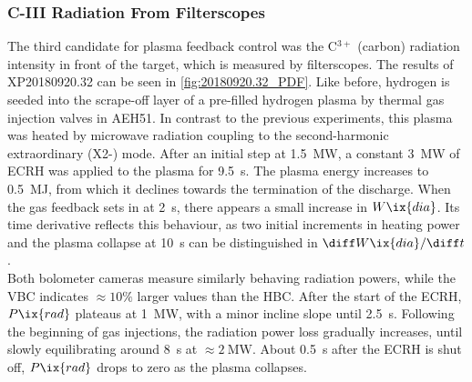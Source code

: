             \subsubsection*{C-III Radiation From Filterscopes}
%
                The third candidate for plasma feedback control was the C$^{3+}$ (carbon) radiation intensity in front of the target, which is measured by filterscopes. The results of XP20180920.32 can be seen in \cref{fig:20180920.32_PDF}. Like before, hydrogen is seeded into the scrape-off layer of a pre-filled hydrogen plasma by thermal gas injection valves in AEH51. In contrast to the previous experiments, this plasma was heated by microwave radiation coupling to the second-harmonic extraordinary (X2-) mode. After an initial step at \SI{1.5}{\mega\watt}, a constant \SI{3}{\mega\watt} of ECRH was applied to the plasma for \SI{9.5}{\second}. The plasma energy increases to \SI{0.5}{\mega\joule}, from which it declines towards the termination of the discharge. When the gas feedback sets in at \SI{2}{\second}, there appears a small increase in $W\ix{dia}$. Its time derivative reflects this behaviour, as two initial increments in heating power and the plasma collapse at \SI{10}{\second} can be distinguished in $\diff W\ix{dia}/\diff t$.\\%
                Both bolometer cameras measure similarly behaving radiation powers, while the VBC indicates $\approx10\%$ larger values than the HBC. After the start of the ECRH, $P\ix{rad}$ plateaus at \SI{1}{\mega\watt}, with a minor incline slope until \SI{2.5}{\second}. Following the beginning of gas injections, the radiation power loss gradually increases, until slowly equilibrating around \SI{8}{\second} at $\approx\SI{2}{\mega\watt}$. About \SI{0.5}{\second} after the ECRH is shut off, $P\ix{rad}$ drops to zero as the plasma collapses.\\%
%
